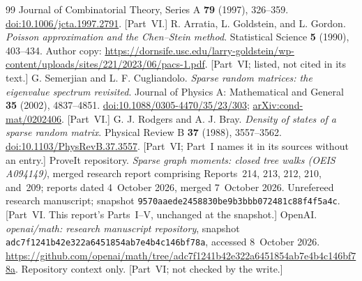 \documentclass[11pt,letterpaper]{article}
\theoremstyle{remark}\newtheorem{remark}[theorem]{Remark}
\theoremstyle{definition}\newtheorem{definition}[theorem]{Definition}
\begin{document}
\begin{thebibliography}{99}
Journal of Combinatorial Theory, Series A \textbf{79} (1997), 326--359.
\href{https://doi.org/10.1006/jcta.1997.2791}{doi:10.1006/jcta.1997.2791}. [Part~VI.]
 R. Arratia, L. Goldstein, and L. Gordon.
\emph{Poisson approximation and the Chen--Stein method}.
Statistical Science \textbf{5} (1990), 403--434.
Author copy: \url{https://dornsife.usc.edu/larry-goldstein/wp-content/uploads/sites/221/2023/06/pacs-1.pdf}. [Part~VI; listed, not cited in its text.]
 G. Semerjian and L. F. Cugliandolo.
\emph{Sparse random matrices: the eigenvalue spectrum revisited}.
Journal of Physics A: Mathematical and General \textbf{35} (2002), 4837--4851.
\href{https://doi.org/10.1088/0305-4470/35/23/303}{doi:10.1088/0305-4470/35/23/303};
\href{https://arxiv.org/abs/cond-mat/0202406}{arXiv:cond-mat/0202406}. [Part~VI.]
 G. J. Rodgers and A. J. Bray.
\emph{Density of states of a sparse random matrix}.
Physical Review B \textbf{37} (1988), 3557--3562.
\href{https://doi.org/10.1103/PhysRevB.37.3557}{doi:10.1103/PhysRevB.37.3557}. [Part~VI; Part~I names it in its sources without an entry.]
 ProveIt repository.
\emph{Sparse graph moments: closed tree walks (OEIS A094149)}, merged research report comprising
Reports~214, 213, 212, 210, and~209; reports dated 4~October 2026, merged 7~October 2026.
Unrefereed research manuscript; snapshot \texttt{9570aaede2458830be9b3bbb072481c88f4f5a4c}.
[Part~VI. This report's Parts~I--V, unchanged at the snapshot.]
 OpenAI.
\emph{openai/math: research manuscript repository}, snapshot
\texttt{adc7f1241b42e322a6451854ab7e4b4c146bf78a}, accessed 8~October 2026.
\url{https://github.com/openai/math/tree/adc7f1241b42e322a6451854ab7e4b4c146bf78a}.
Repository context only. [Part~VI; not checked by the write.]
\end{thebibliography}
\end{document}
